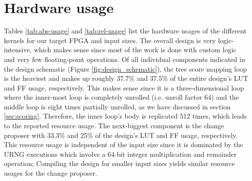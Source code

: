 \section{Hardware usage}

Tables \ref{tab:abs-usage} and \ref{tab:rel-usage} list the hardware usages of the different kernels for our target \ac{FPGA} and input sizes. The overall design is very logic-intensive, which makes sense since most of the work is done with custom logic and very few floating-point operations. Of all individual components indicated in the design schematic (Figure \ref{fig:design_schematic}), the tree score mapping loop is the heaviest and makes up roughly 37.7\% and 37.5\% of the entire design's \ac{LUT} and \ac{FF} usage, respectively. This makes sense since it is a three-dimensional loop where the inner-most loop is completely unrolled (i.e. unroll factor 64) and the middle loop is eight times partially unrolled, as we have discussed in section \ref{sec:scoring}. Therefore, the inner loop's body is replicated 512 times, which leads to the reported resource usage. The next-biggest component is the change proposer with 33.3\% and 25\% of the design's \ac{LUT} and \ac{FF} usage, respectively. This resource usage is independent of the input size since it is dominated by the \ac{URNG} executions which involve a 64-bit integer multiplication and remainder operation; Compiling the design for smaller input sizes yields similar resource usages for the change proposer.

